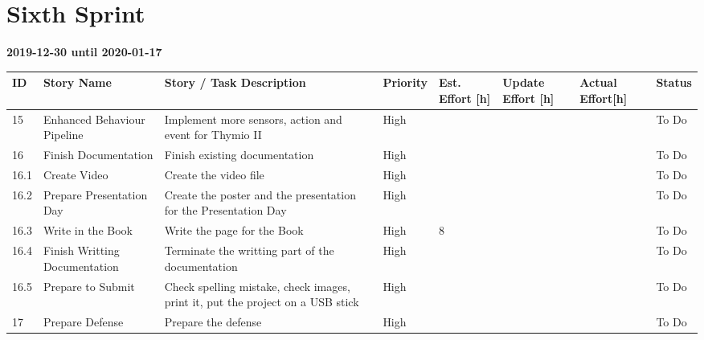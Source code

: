 \documentclass{scrbook}
\begin{document}
\section{Sixth Sprint}
\textbf{2019-12-30 until 2020-01-17}
\begin{longtable}{p{5mm}|p{2cm}|p{4cm}|p{1cm}|p{1cm}|p{1cm}|p{1cm}|p{15mm}}
  ID                     & Story Name & Story / Task Description & Priority & Est. Effort {[}h{]} & Update Effort {[}h{]} & Actual Effort{[}h{]} & Status                \\ \hline
  15 & Enhanced Behaviour Pipeline & Implement more sensors, action and event for Thymio II & High &  &  &  & To Do \\ 
  16 & Finish Documentation & Finish existing documentation & High &  &  &  & To Do \\
  16.1 & Create Video & Create the video file & High &  &  &  & To Do \\ 
  16.2 & Prepare Presentation Day & Create the poster and the presentation for the Presentation Day & High &  &  &  & To Do \\
  16.3 & Write in the Book & Write the page for the Book & High & 8 &  &  & To Do \\ 
  16.4 & Finish Writting Documentation & Terminate the writting part of the documentation & High &  &  &  & To Do \\ 
  16.5 & Prepare to Submit & Check spelling mistake, check images, print it, put the project on a USB stick & High &  &  &  & To Do\\ 
  17 & Prepare Defense & Prepare the defense & High &  &  &  & To Do \\ \hline
\end{longtable}
\end{document}
